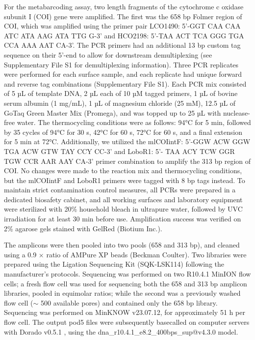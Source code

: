 For the metabarcoding assay, two length fragments of the cytochrome c oxidase subunit I (COI) gene were amplified. The first was the 658 bp Folmer region of COI, which was amplified using the primer pair LCO1490: 5'-GGT CAA CAA ATC ATA AAG ATA TTG G-3' and HCO2198: 5'-TAA ACT TCA GGG TGA CCA AAA AAT CA-3'\cite{folmer-1994}. The PCR primers had an additional 13 bp custom tag sequence on their 5’-end to allow for downstream demultiplexing \cite{meier-2016, srivathsan-2019} (see Supplementary File S1 for demultiplexing information). Three PCR replicates were performed for each surface sample, and each replicate had unique forward and reverse tag combinations (Supplementary File S1). Each PCR mix consisted of 5 µL of template DNA, 2 µL each of 10 µM tagged primers, 1 µL of bovine serum albumin (1 mg/mL), 1 µL of magnesium chloride (25 mM), 12.5 µL of GoTaq Green Master Mix (Promega), and was topped up to 25 µL with nuclease-free water. The thermocycling conditions were as follows: 94°C for 5 min, followed by 35 cycles of 94°C for 30 s, 42°C for 60 s, 72°C for 60 s, and a final extension for 5 min at 72°C. Additionally, we utilized the mlCOIintF: 5'-GGW ACW GGW TGA ACW GTW TAY CCY CC-3' \cite{leray-2013} and LoboR1: 5'- TAA ACY TCW GGR TGW CCR AAR AAY CA-3' \cite{lobo-2013} primer combination to amplify the 313 bp region of COI. No changes were made to the reaction mix and thermocycling conditions, but the mlCOIintF and LoboR1 primers were tagged with 8 bp tags instead. To maintain strict contamination control measures, all PCRs were prepared in a dedicated biosafety cabinet, and all working surfaces and laboratory equipment were sterilized with 20\% household bleach in ultrapure water, followed by UVC irradiation for at least 30 min before use. Amplification success was verified on 2\% agarose gels stained with GelRed (Biotium Inc.).

The amplicons were then pooled into two pools (658 and 313 bp), and cleaned using a 0.9 × ratio of AMPure XP beads (Beckman Coulter). Two libraries were prepared using the Ligation Sequencing Kit (SQK-LSK114) following the manufacturer’s protocols. Sequencing was performed on two R10.4.1 MinION flow cells; a fresh flow cell was used for sequencing both the 658 and 313 bp amplicon libraries, pooled in equimolar ratios; while the second was a previously washed flow cell ($\sim$ 500 available pores) and contained only the 658 bp library. Sequencing was performed on MinKNOW v23.07.12, for approximately 51 h per flow cell. The output pod5 files were subsequently basecalled on computer servers with Dorado v0.5.1 \cite{dorado}, using the dna\_r10.4.1\_e8.2\_400bps\_sup@v4.3.0 model.

